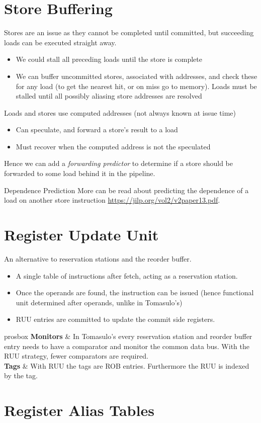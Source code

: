 \section{Store Buffering}
Stores are an issue as they cannot be completed until committed, but succeeding loads can be executed straight away.
\begin{itemize}
    \item We could stall all preceding loads until the store is complete
    \item We can buffer uncommitted stores, associated with addresses, and check these for any load (to get the nearest hit, or on miss go to memory). Loads must be stalled until all possibly aliasing store addresses are resolved
\end{itemize}
Loads and stores use computed addresses (not always known at issue time)
\begin{itemize}
    \item Can speculate, and forward a store's result to a load
    \item Must recover when the computed address is not the speculated
\end{itemize}
Hence we can add a \textit{forwarding predictor} to determine if a store should be forwarded to some load behind it in the pipeline.
\begin{sidenotebox}{Dependence Prediction}
    More can be read about predicting the dependence of a load on another store instruction \href{here}{https://jilp.org/vol2/v2paper13.pdf}.
\end{sidenotebox}

\section{Register Update Unit}
An alternative to reservation stations and the reorder buffer.
\begin{itemize}
    \item A single table of instructions after fetch, acting as a reservation station.
    \item Once the operands are found, the instruction can be issued (hence functional unit determined after operands, unlike in Tomasulo's)
    \item RUU entries are committed to update the commit side registers.
\end{itemize}
\begin{tabbox}{prosbox}
    \textbf{Monitors} & In Tomasulo's every reservation station and reorder buffer entry needs to have a comparator and monitor the common data bus. With the RUU strategy, fewer comparators are required. \\
    \textbf{Tags} & With RUU the tags are ROB entries. Furthermore the RUU is indexed by the tag. \\
\end{tabbox}

\section{Register Alias Tables}
\unfinished

